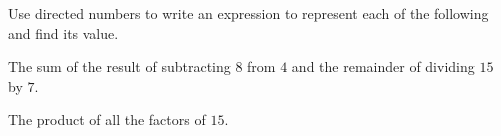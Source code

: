  Use directed numbers to write an expression to represent each of the following and find its value.

\begin{subparts}
  \item The sum of the result of subtracting $8$ from $4$ and the remainder of dividing $15$ by $7$.
  \item The product of all the factors of $15$.
\end{subparts}

